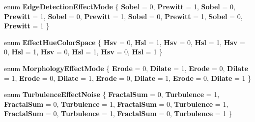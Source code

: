 \begin{DoxyCompactItemize}
enum {\bfseries Edge\+Detection\+Effect\+Mode} \{ \newline
{\bfseries Sobel} = 0, 
{\bfseries Prewitt} = 1, 
{\bfseries Sobel} = 0, 
{\bfseries Prewitt} = 1, 
\newline
{\bfseries Sobel} = 0, 
{\bfseries Prewitt} = 1, 
{\bfseries Sobel} = 0, 
{\bfseries Prewitt} = 1, 
\newline
{\bfseries Sobel} = 0, 
{\bfseries Prewitt} = 1
 \}
\item 
\mbox{\label{namespace_microsoft_1_1_graphics_1_1_canvas_1_1_effects_ae7299c185ad53a8bf344202e319bf35a}} 
enum {\bfseries Effect\+Hue\+Color\+Space} \{ \newline
{\bfseries Hsv} = 0, 
{\bfseries Hsl} = 1, 
{\bfseries Hsv} = 0, 
{\bfseries Hsl} = 1, 
\newline
{\bfseries Hsv} = 0, 
{\bfseries Hsl} = 1, 
{\bfseries Hsv} = 0, 
{\bfseries Hsl} = 1, 
\newline
{\bfseries Hsv} = 0, 
{\bfseries Hsl} = 1
 \}
\item 
\mbox{\label{namespace_microsoft_1_1_graphics_1_1_canvas_1_1_effects_a41ef1609f91e4fdf47d735886d2d455b}} 
enum {\bfseries Morphology\+Effect\+Mode} \{ \newline
{\bfseries Erode} = 0, 
{\bfseries Dilate} = 1, 
{\bfseries Erode} = 0, 
{\bfseries Dilate} = 1, 
\newline
{\bfseries Erode} = 0, 
{\bfseries Dilate} = 1, 
{\bfseries Erode} = 0, 
{\bfseries Dilate} = 1, 
\newline
{\bfseries Erode} = 0, 
{\bfseries Dilate} = 1
 \}
\item 
\mbox{\label{namespace_microsoft_1_1_graphics_1_1_canvas_1_1_effects_a57ff6492fca7c9d4ed49c3588ec24c76}} 
enum {\bfseries Turbulence\+Effect\+Noise} \{ \newline
{\bfseries Fractal\+Sum} = 0, 
{\bfseries Turbulence} = 1, 
{\bfseries Fractal\+Sum} = 0, 
{\bfseries Turbulence} = 1, 
\newline
{\bfseries Fractal\+Sum} = 0, 
{\bfseries Turbulence} = 1, 
{\bfseries Fractal\+Sum} = 0, 
{\bfseries Turbulence} = 1, 
\newline
{\bfseries Fractal\+Sum} = 0, 
{\bfseries Turbulence} = 1
 \}
\end{DoxyCompactItemize}
